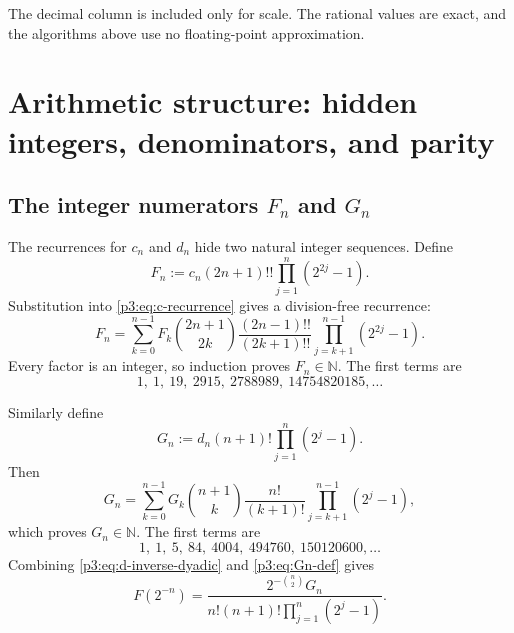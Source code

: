 \documentclass[11pt]{article}
\numberwithin{equation}{section}
\theoremstyle{definition}
\theoremstyle{remark}
\newcommand{\N}{\mathbb N}
\begin{document}
The decimal column is included only for scale.  The rational values are exact, and the algorithms above use no floating-point approximation.


\section{Arithmetic structure: hidden integers, denominators, and parity}\label{p3:sec:arithmetic}

\subsection{The integer numerators $F_n$ and $G_n$}

The recurrences for $c_n$ and $d_n$ hide two natural integer sequences.  Define
\begin{equation}\label{p3:eq:Fn-def}
 F_n:=c_n(2n+1)!!\prod_{j=1}^{n}(2^{2j}-1).
\end{equation}
Substitution into \eqref{p3:eq:c-recurrence} gives a division-free recurrence:
\begin{equation}\label{p3:eq:Fn-recurrence}
 F_n=\sum_{k=0}^{n-1}F_k\binom{2n+1}{2k}
 \frac{(2n-1)!!}{(2k+1)!!}
 \prod_{j=k+1}^{n-1}(2^{2j}-1).
\end{equation}
Every factor is an integer, so induction proves $F_n\in\N$.  The first terms are
\begin{equation}\label{p3:eq:Fn-values}
 1,\ 1,\ 19,\ 2915,\ 2788989,\ 14754820185,\ldots
\end{equation}

Similarly define
\begin{equation}\label{p3:eq:Gn-def}
 G_n:=d_n(n+1)!\prod_{j=1}^{n}(2^j-1).
\end{equation}
Then
\begin{equation}\label{p3:eq:Gn-recurrence}
 G_n=\sum_{k=0}^{n-1}G_k\binom{n+1}{k}
 \frac{n!}{(k+1)!}\prod_{j=k+1}^{n-1}(2^j-1),
\end{equation}
which proves $G_n\in\N$.  The first terms are
\begin{equation}\label{p3:eq:Gn-values}
 1,\ 1,\ 5,\ 84,\ 4004,\ 494760,\ 150120600,\ldots
\end{equation}
Combining \eqref{p3:eq:d-inverse-dyadic} and \eqref{p3:eq:Gn-def} gives
\begin{equation}\label{p3:eq:F-inverse-Gn}
 F(2^{-n})=
 \frac{2^{-\binom n2}G_n}
 {n!(n+1)!\displaystyle\prod_{j=1}^{n}(2^j-1)}.
\end{equation}
\end{document}
